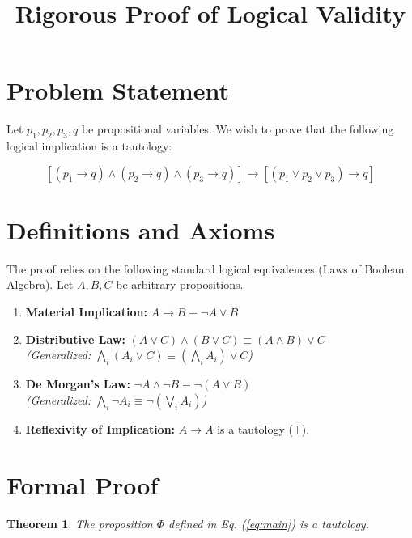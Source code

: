 \documentclass[12pt,a4paper]{article}
\title{\textbf{Rigorous Proof of Logical Validity}}
\author{}
\date{}
\theoremstyle{plain}
\newtheorem{theorem}{Theorem}
\theoremstyle{definition}
\begin{document}
\maketitle

\section{Problem Statement}

Let $p_1, p_2, p_3, q$ be propositional variables. We wish to prove that the following logical implication is a tautology:

\begin{equation}
\label{eq:main}
\left[ (p_1 \to q) \land (p_2 \to q) \land (p_3 \to q) \right] \longrightarrow \left[ (p_1 \lor p_2 \lor p_3) \to q \right]
\end{equation}

\section{Definitions and Axioms}

The proof relies on the following standard logical equivalences (Laws of Boolean Algebra). Let $A, B, C$ be arbitrary propositions.

\begin{enumerate}
    \item \textbf{Material Implication:} $A \to B \equiv \neg A \lor B$
    \item \textbf{Distributive Law:} $(A \lor C) \land (B \lor C) \equiv (A \land B) \lor C$ \\
    \textit{(Generalized: $\bigwedge_{i} (A_i \lor C) \equiv (\bigwedge_{i} A_i) \lor C$)}
    \item \textbf{De Morgan's Law:} $\neg A \land \neg B \equiv \neg (A \lor B)$ \\
    \textit{(Generalized: $\bigwedge_{i} \neg A_i \equiv \neg (\bigvee_{i} A_i)$)}
    \item \textbf{Reflexivity of Implication:} $A \to A$ is a tautology ($\top$).
\end{enumerate}

\section{Formal Proof}

\begin{theorem}
The proposition $\Phi$ defined in Eq. (\ref{eq:main}) is a tautology.
\end{theorem}
\end{document}
